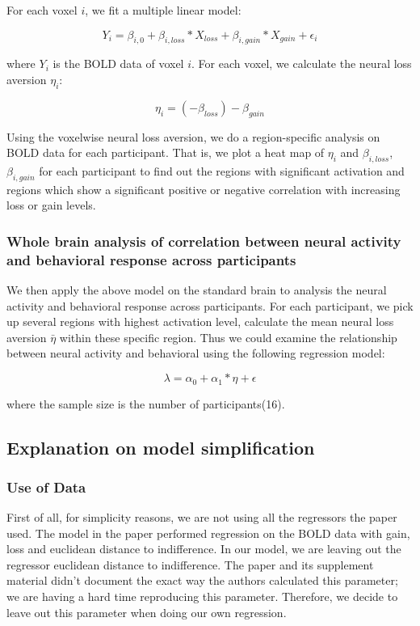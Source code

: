 For each voxel $i$, we fit a multiple linear model:

\begin{equation}
Y_{i} = \beta_{i, 0} + \beta_{i, loss} *X_{loss} + \beta_{i, gain} * X_{gain}  + \epsilon_i
\end{equation}

where $Y_{i}$ is the BOLD data of voxel $i$. For each voxel, we calculate the neural loss aversion $\eta_i$:

\begin{equation}
\eta_i = (-\beta_{loss}) - \beta_{gain}
\end{equation}

Using the voxelwise neural loss aversion, we do a region-specific analysis on BOLD data for each participant. That is, we plot a heat map of $\eta_i$ and  $\beta_{i, loss}$, $ \beta_{i, gain}$ for each participant to find out the regions with significant activation and regions which show a significant positive or negative correlation with increasing loss or gain levels.

\subsubsection{Whole brain analysis of correlation between neural activity and behavioral response across participants}

We then apply the above model on the standard brain to analysis the neural activity and behavioral response across participants. For each participant, we pick up several regions with highest activation level, calculate the mean neural loss aversion $\bar{\eta}$ within these specific region. Thus we could examine the relationship between neural activity and behavioral using the following regression model:

\begin{equation}
\lambda = \alpha_0 + \alpha_1 * \eta + \epsilon
\end{equation}

where the sample size is the number of participants(16).


\subsection{Explanation on model simplification}

\subsubsection{Use of Data}
\indent \indent First of all, for simplicity reasons, we are not using all the regressors the paper used. The model in the paper performed regression on the BOLD data with gain, loss and euclidean distance to indifference. In our model, we are leaving out the regressor euclidean distance to indifference. The paper and its supplement material didn't document the exact way the authors calculated this parameter; we are having a hard time reproducing this parameter. Therefore, we decide to leave out this parameter when doing our own regression.

